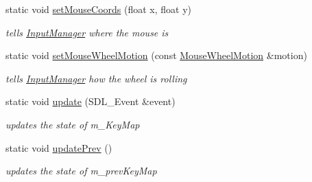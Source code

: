 \begin{DoxyCompactItemize}
\mbox{\label{classnta_1_1InputManager_a42590ba480b5fd5280cbc69732bb025f}} 
static void \hyperlink{classnta_1_1InputManager_a42590ba480b5fd5280cbc69732bb025f}{set\+Mouse\+Coords} (float x, float y)
\begin{DoxyCompactList}\small\item\em tells \hyperlink{classnta_1_1InputManager}{Input\+Manager} where the mouse is \end{DoxyCompactList}\item 
\mbox{\label{classnta_1_1InputManager_a716c722f10dfe636b79384087bbf1a6e}} 
static void \hyperlink{classnta_1_1InputManager_a716c722f10dfe636b79384087bbf1a6e}{set\+Mouse\+Wheel\+Motion} (const \hyperlink{namespacenta_aabafd53ba7264997db9e6e934a8ade2b}{Mouse\+Wheel\+Motion} \&motion)
\begin{DoxyCompactList}\small\item\em tells \hyperlink{classnta_1_1InputManager}{Input\+Manager} how the wheel is rolling \end{DoxyCompactList}\item 
\mbox{\label{classnta_1_1InputManager_a7c555e0a2ce37af042b5016140414f18}} 
static void \hyperlink{classnta_1_1InputManager_a7c555e0a2ce37af042b5016140414f18}{update} (S\+D\+L\+\_\+\+Event \&event)
\begin{DoxyCompactList}\small\item\em updates the state of m\+\_\+\+Key\+Map \end{DoxyCompactList}\item 
\mbox{\label{classnta_1_1InputManager_aea4219a830a2b1d9ee87bdc5f954903d}} 
static void \hyperlink{classnta_1_1InputManager_aea4219a830a2b1d9ee87bdc5f954903d}{update\+Prev} ()
\begin{DoxyCompactList}\small\item\em updates the state of m\+\_\+prev\+Key\+Map \end{DoxyCompactList}\end{DoxyCompactItemize}
